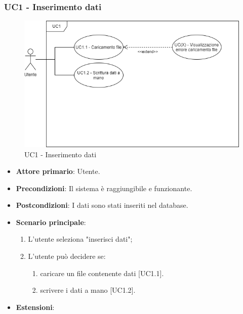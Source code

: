 \subsubsection{UC1 - Inserimento dati}
\begin{figure}[h]
\includegraphics[width=\linewidth]{section/images/UC1-Inserimentodati.png}
\centering
\caption{UC1 - Inserimento dati}
\end{figure}
\begin{itemize}
	\item \textbf{Attore primario}: Utente.
	\item \textbf{Precondizioni}: Il sistema è raggiungibile e funzionante.
	\item \textbf{Postcondizioni}: I dati sono stati inseriti nel database.
	\item \textbf{Scenario principale}:
		\begin{enumerate}
			\item L'utente seleziona "inserisci dati";
			\item L'utente può decidere se:
			\begin{enumerate}
			\item caricare un file contenente dati [UC1.1].
			\item scrivere i dati a mano [UC1.2].
			\end{enumerate}
		\end{enumerate}
	\item \textbf{Estensioni}:
\end{itemize}
